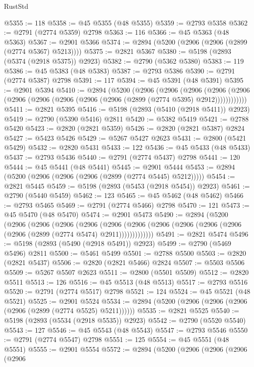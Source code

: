 \begin{lexlean}{RustStd}
\begin{coremodule}
@5355 := 118
@5358 := @45 @5355 (@48 @5355)
@5359 := @2793 @5358
@5362 := @2791 (@2774 @5359) @2798
@5363 := 116
@5366 := @45 @5363 (@48 @5363)
@5367 := @2901 @5366
@5374 := @2894 (@5200 (@2906 (@2906 (@2899 (@2774 @5367) @5213))))
@5375 := @2821 @5367
@5380 := @5198 (@2893 (@5374 (@2918 @5375)) @2923)
@5382 := @2790 (@5362 @5380)
@5383 := 119
@5386 := @45 @5383 (@48 @5383)
@5387 := @2793 @5386
@5390 := @2791 (@2774 @5387) @2798
@5391 := 117
@5394 := @45 @5391 (@48 @5391)
@5395 := @2901 @5394
@5410 := @2894
    (@5200
      (@2906
        (@2906
          (@2906
            (@2906 (@2906 (@2906 (@2906 (@2906 (@2906 (@2906 (@2899 (@2774 @5395) @2912))))))))))))
@5411 := @2821 @5395
@5416 := @5198 (@2893 (@5410 (@2918 @5411)) @2923)
@5419 := @2790 (@5390 @5416) @2811
@5420 := @5382 @5419
@5421 := @2788 @5420
@5423 := @2820 (@2821 @5359)
@5426 := @2820 (@2821 @5387) @2824
@5427 := @5423 @5426
@5429 := @5267 @5427 @2623
@5431 := @2800 (@5421 @5429)
@5432 := @2820 @5431
@5433 := 122
@5436 := @45 @5433 (@48 @5433)
@5437 := @2793 @5436
@5440 := @2791 (@2774 @5437) @2798
@5441 := 120
@5444 := @45 @5441 (@48 @5441)
@5445 := @2901 @5444
@5453 := @2894 (@5200 (@2906 (@2906 (@2906 (@2899 (@2774 @5445) @5212)))))
@5454 := @2821 @5445
@5459 := @5198 (@2893 (@5453 (@2918 @5454)) @2923)
@5461 := @2790 (@5440 @5459)
@5462 := 123
@5465 := @45 @5462 (@48 @5462)
@5466 := @2793 @5465
@5469 := @2791 (@2774 @5466) @2798
@5470 := 121
@5473 := @45 @5470 (@48 @5470)
@5474 := @2901 @5473
@5490 := @2894
    (@5200
      (@2906
        (@2906
          (@2906
            (@2906
              (@2906
                (@2906 (@2906 (@2906 (@2906 (@2906 (@2906 (@2899 (@2774 @5474) @2911)))))))))))))
@5491 := @2821 @5474
@5496 := @5198 (@2893 (@5490 (@2918 @5491)) @2923)
@5499 := @2790 (@5469 @5496) @2811
@5500 := @5461 @5499
@5501 := @2788 @5500
@5503 := @2820 (@2821 @5437)
@5506 := @2820 (@2821 @5466) @2824
@5507 := @5503 @5506
@5509 := @5267 @5507 @2623
@5511 := @2800 (@5501 @5509)
@5512 := @2820 @5511
@5513 := 126
@5516 := @45 @5513 (@48 @5513)
@5517 := @2793 @5516
@5520 := @2791 (@2774 @5517) @2798
@5521 := 124
@5524 := @45 @5521 (@48 @5521)
@5525 := @2901 @5524
@5534 := @2894 (@5200 (@2906 (@2906 (@2906 (@2906 (@2899 (@2774 @5525) @5211))))))
@5535 := @2821 @5525
@5540 := @5198 (@2893 (@5534 (@2918 @5535)) @2923)
@5542 := @2790 (@5520 @5540)
@5543 := 127
@5546 := @45 @5543 (@48 @5543)
@5547 := @2793 @5546
@5550 := @2791 (@2774 @5547) @2798
@5551 := 125
@5554 := @45 @5551 (@48 @5551)
@5555 := @2901 @5554
@5572 := @2894
    (@5200
      (@2906
        (@2906
          (@2906
            (@2906

\end{coremodule}
\end{lexlean}
